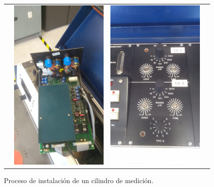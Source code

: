 \documentclass[a0]{sciposter}
\begin{document}
\begin{multicols}{3}
\begin{figure}
\begin{tabular}{cccc}
			& \includegraphics[width=0.2\linewidth]{../Tesis/Figures/process/p3} & \includegraphics[width=0.2\linewidth]{../Tesis/Figures/process/p4} \\
		\end{tabular}
		\caption{Proceso de instalación de un cilindro de medición.}
	\end{figure}
	

\end{multicols}
\end{document}
